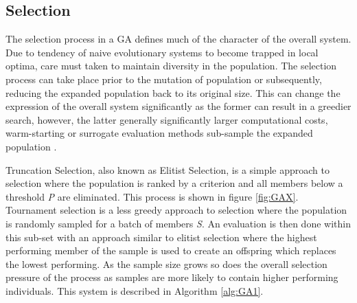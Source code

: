 \subsection {Selection}
	The selection process in a GA defines much of the character of the overall system. Due to tendency of naive evolutionary systems to become trapped in local optima, care must taken to maintain diversity in the population. The selection process can take place prior to the mutation of population or subsequently, reducing the expanded population back to its original size. This can change the expression of the overall system significantly as the former can result in a greedier search, however, the latter generally significantly larger computational costs, warm-starting or surrogate evaluation methods sub-sample the expanded population \cite{5,13,39}.



	Truncation Selection, also known as Elitist Selection, is a simple approach to selection where the population is ranked by a criterion and all members below a threshold \textit{P} are eliminated. This process is shown in figure \ref{fig:GAX}. Tournament selection is a less greedy approach to selection where the population is randomly sampled for a batch of members \textit{S}. An evaluation is then done within this sub-set with an approach similar to elitist selection where the highest performing member of the sample is used to create an offspring which replaces the lowest performing. As the sample size grows so does the overall selection pressure of the process as samples are more likely to contain higher performing individuals. This system is described in Algorithm \ref{alg:GA1}.



